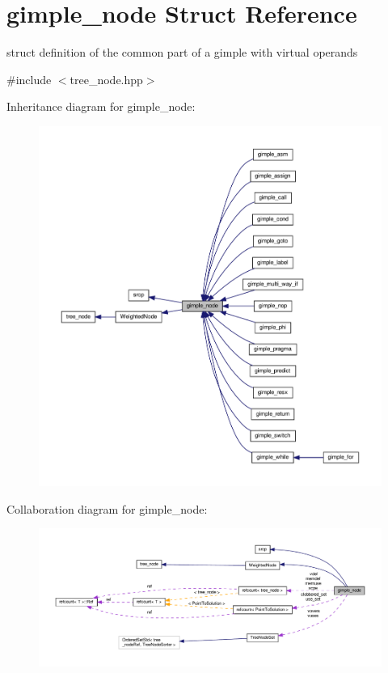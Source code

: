 \hypertarget{structgimple__node}{}\section{gimple\+\_\+node Struct Reference}
\label{structgimple__node}


struct definition of the common part of a gimple with virtual operands  




{\ttfamily \#include $<$tree\+\_\+node.\+hpp$>$}



Inheritance diagram for gimple\+\_\+node\+:
\nopagebreak
\begin{figure}[H]
\begin{center}
\leavevmode
\includegraphics[width=350pt]{dd/d4b/structgimple__node__inherit__graph}
\end{center}
\end{figure}


Collaboration diagram for gimple\+\_\+node\+:
\nopagebreak
\begin{figure}[H]
\begin{center}
\leavevmode
\includegraphics[width=350pt]{d2/d70/structgimple__node__coll__graph}
\end{center}
\end{figure}

